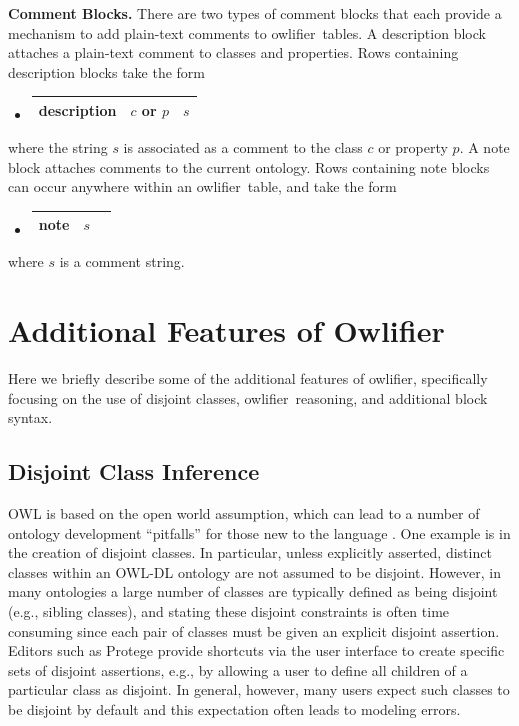 \documentclass[5p,authoryear]{elsarticle}
\newcommand{\Owlifier}{\textsf{Owlifier}}
\newcommand{\owlifier}{\textsf{owlifier}}
\newcommand{\myblock}[1]{\vspace{12pt}\noindent\textbf{#1}}
\begin{document}
\myblock{Comment Blocks.} There are two types of comment blocks that
each provide a mechanism to add plain-text comments to \owlifier\
tables. A description block attaches a plain-text comment to classes
and properties. Rows containing description blocks take the form
\begin{itemize}
\item[]
  \begin{tabular}{|l|l|l|}\hline \textsf{description} & $c$ or $p$ & $s$
    \\ \hline
  \end{tabular}
\end{itemize}
where the string $s$ is associated as a comment to the class $c$ or
property $p$. A note block attaches comments to the current
ontology. Rows containing note blocks can occur anywhere within an
\owlifier\ table, and take the form
\begin{itemize}
\item[]
  \begin{tabular}{|l|l|l|}\hline \textsf{note} & $s$
\\ \hline
  \end{tabular}
\end{itemize}
where $s$ is a comment string. 


\section{Additional Features of \Owlifier}
\label{sec:features}

Here we briefly describe some of the additional features of \owlifier,
specifically focusing on the use of disjoint classes, \owlifier\
reasoning, and additional block syntax.
 
\subsection{Disjoint Class Inference}

OWL is based on the open world assumption, which can lead to a number
of ontology development ``pitfalls'' for those new to the language
\citep{smith04:_owl_web_ontol_languag_guide,rector04:_owl_pizzas}. One
example is in the creation of disjoint classes.  In particular, unless
explicitly asserted, distinct classes within an OWL-DL ontology are
not assumed to be disjoint. However, in many ontologies a large number
of classes are typically defined as being disjoint (e.g., sibling
classes), and stating these disjoint constraints is often
time consuming since each pair of classes must be given an explicit
disjoint assertion. Editors such as Protege
\citep{knublauch04:_editin_descr_logic_ontol_with} provide shortcuts
via the user interface to create specific sets of disjoint assertions,
e.g., by allowing a user to define all children of a particular class
as disjoint. In general, however, many users expect such classes to be
disjoint by default \citep{rector04:_owl_pizzas} and this expectation
often leads to modeling errors.
\end{document}

